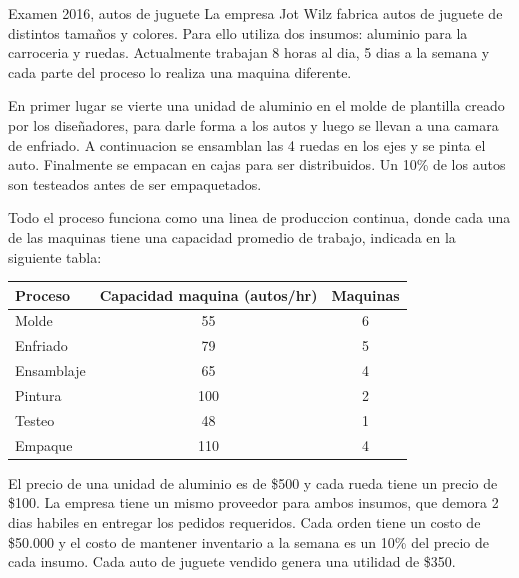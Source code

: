 \begin{enunciado}{Examen 2016, autos de juguete}
La empresa Jot Wilz fabrica autos de juguete de distintos tamaños y colores. Para ello utiliza dos insumos: aluminio para la carroceria y ruedas. Actualmente trabajan 8 horas al dia, 5 dias a la semana y cada parte del proceso lo realiza una maquina diferente.

En primer lugar se vierte una unidad de aluminio en el molde de plantilla creado por los diseñadores, para darle forma a los autos y luego se llevan a una camara de enfriado. A continuacion se ensamblan las 4 ruedas en los ejes y se pinta el auto. Finalmente se empacan en cajas para ser distribuidos. Un 10\% de los autos son testeados antes de ser empaquetados.

Todo el proceso funciona como una linea de produccion continua, donde cada una de las maquinas tiene una capacidad promedio de trabajo, indicada en la siguiente tabla:

\begin{center}
\begin{tabular}{l|cc}
\toprule
Proceso & Capacidad maquina (autos/hr) & Maquinas\\
\midrule
Molde & 55 & 6\\
Enfriado & 79 & 5\\
Ensamblaje & 65 & 4\\
Pintura & 100 & 2\\
Testeo & 48 & 1\\
Empaque & 110 & 4\\
\bottomrule
\end{tabular}
\end{center}

El precio de una unidad de aluminio es de \$500 y cada rueda tiene un precio de \$100. La empresa tiene un mismo proveedor para ambos insumos, que demora 2 dias habiles en entregar los pedidos requeridos. Cada orden tiene un costo de \$50.000 y el costo de mantener inventario a la semana es un 10\% del precio de cada insumo. Cada auto de juguete vendido genera una utilidad de \$350.


\end{enunciado}
